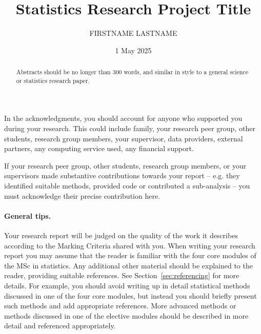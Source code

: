 \documentclass{statsmsc}
\title{Statistics Research Project Title}
\author{FIRSTNAME LASTNAME}
\date{1 May 2025}
\begin{document}
\maketitle

\declaration 

\begin{acknowledgements}
    In the acknowledgments, you should account for anyone who supported you during your research. This could include family, your research peer group, other students, research group members, your supervisor, data providers, external partners, any computing service used, any financial support. 
    
    If your research peer group, other students, research group members, or your supervisors made substantive contributions towards your report -- e.g. they identified suitable methods, provided code or contributed a sub-analysis -- you must acknowledge their precise contribution here.
\end{acknowledgements}

\mainmatter


\begin{abstract}
    Abstracts should be no longer than 300 words, and similar in style to a general science or statistics research paper.
\end{abstract}

%
%
\paragraph{General tips.} Your research report will be judged on the quality of the work it describes according to the Marking Criteria shared with you. 
When writing your research report you may assume that the reader is familiar with the four core modules of the MSc in statistics. Any additional other material should be explained to the reader, providing suitable references. See Section~\ref{sec:referencing} for more details. For example, you should avoid writing up in detail statistical methods discussed in one of the four core modules, but instead you should briefly present such methods and add appropriate references. More advanced methods or methods discussed in one of the elective modules should be described in more detail and referenced appropriately. 
\end{document}
